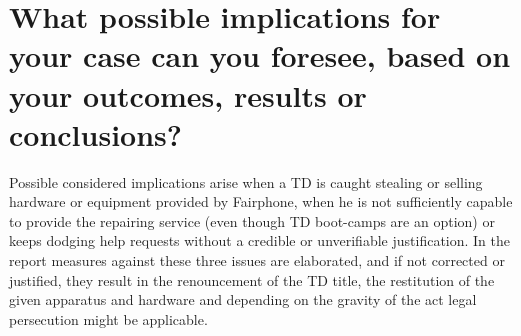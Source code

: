 \section{What possible implications for your case can you foresee, based on your outcomes, results or conclusions?}

Possible considered implications arise when a TD is caught stealing or selling hardware or equipment provided by Fairphone, when he is not sufficiently capable to provide the repairing service (even though TD boot-camps are an option) or keeps dodging help requests without a credible or unverifiable justification.
 In the report measures against these three issues are elaborated, and if not corrected or justified, they result in the renouncement of the TD title, the restitution of the given apparatus and hardware and depending on the gravity of the act legal persecution might be applicable.

